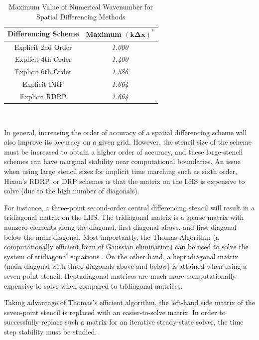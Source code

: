 \documentclass[conf]{new-aiaa}
\begin{document}
\begin{table}[hbtp!]
\caption[Maximum value of numerical wavenumber] {Maximum Value of Numerical Wavenumber for Spatial Differencing Methods}
\centering
\begin{tabular}{|c|c|}
\hline
{\textbf{Differencing Scheme}} & \textbf{Maximum $\mathbf{(k\Delta{x})^*}$} \\ \hline
{{Explicit 2nd Order}} & \textit{1.000} \\ \hline
{{Explicit 4th Order}} & \textit{1.400} \\ \hline
{{Explicit 6th Order}} & \textit{1.586} \\ \hline
{{Explicit DRP}} & \textit{1.664} \\ \hline
{{Explicit RDRP}} & \textit{1.664} \\ \hline
\end{tabular}
\\
\label{tab:Numerical_Wave}
\end{table}



In general, increasing the order of accuracy of a spatial differencing scheme will also improve its accuracy on a given grid. 
However, the stencil size of the scheme must be increased to obtain a higher order of accuracy, and these large-stencil schemes can have marginal stability near computational boundaries. 
An issue when using large stencil sizes for implicit time marching such as sixth order, Hixon's RDRP, or DRP schemes is that the matrix on the LHS is expensive to solve (due to the high number of diagonals). 

For instance, a three-point second-order central differencing stencil will result in a tridiagonal matrix on the LHS. 
The tridiagonal matrix is a sparse matrix with nonzero elements along the diagonal, first diagonal above, and first diagonal below the main diagonal. 
Most importantly, the Thomas Algorithm (a computationally efficient form of Gaussian elimination) can be used to solve the system of tridiagonal equations \cite{Thomas_Algo}. 
On the other hand, a heptadiagonal matrix (main diagonal with three diagonals above and below) is attained when using a seven-point stencil. 
Heptadiagonal matrices are much more computationally expensive to solve when compared to tridiagonal matrices. 

Taking advantage of Thomas's efficient algorithm, the left-hand side matrix of the seven-point stencil is replaced with an easier-to-solve matrix. 
In order to successfully replace such a matrix for an iterative steady-state solver, the time step stability must be studied. 
\end{document}
